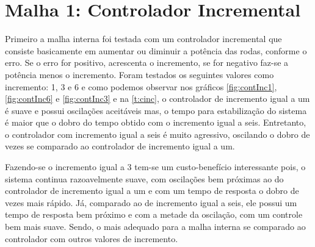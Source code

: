 \section{Malha 1: Controlador Incremental}
\label{m1ContInc}

Primeiro a malha interna foi testada com um controlador incremental que consiste basicamente em aumentar ou diminuir a potência das rodas, conforme o erro. Se o erro for positivo, acrescenta o incremento, se for negativo faz-se a potência menos o incremento. Foram testados os seguintes valores como incremento: 1, 3 e 6 e como podemos observar nos gráficos \ref{fig:contInc1},\ref{fig:contInc6} e \ref{fig:contInc3} e na \autoref{t:cinc}, o controlador de incremento igual a um é suave e possui oscilações aceitáveis mas, o tempo para estabilização do sistema é maior que o dobro do tempo obtido com o incremento igual a seis. Entretanto, o controlador com incremento igual a seis é muito agressivo, oscilando o dobro de vezes se comparado ao controlador de incremento igual a um. 

Fazendo-se o incremento igual a 3 tem-se um custo-benefício interessante pois, o sistema continua razoavelmente suave, com oscilações bem próximas ao do controlador de incremento igual a um e com um tempo de resposta o dobro de vezes mais rápido. Já, comparado ao de incremento igual a seis, ele possui um tempo de resposta bem próximo e com a metade da oscilação, com um controle bem mais suave. Sendo, o mais adequado para a malha interna se comparado ao controlador com outros valores de incremento. 

